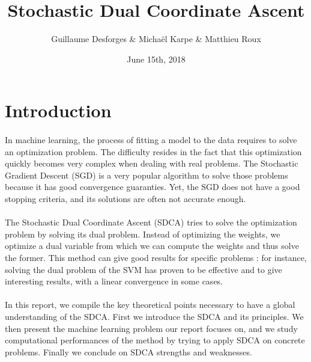 \documentclass{article}
\title{Stochastic Dual Coordinate Ascent}
\author{Guillaume Desforges \& Michaël Karpe \& Matthieu Roux}
\date{June 15th, 2018}
\begin{document}
\maketitle


\section*{Introduction}

\paragraph{}In machine learning, the process of fitting a model to the data requires to solve an optimization problem.
The difficulty resides in the fact that this optimization quickly becomes very complex when dealing with real problems.
The Stochastic Gradient Descent (SGD) is a very popular algorithm to solve those problems because it has good convergence guaranties.
Yet, the SGD does not have a good stopping criteria, and its solutions are often not accurate enough.

\paragraph{}The Stochastic Dual Coordinate Ascent (SDCA) tries to solve the optimization problem by solving its dual problem.
Instead of optimizing the weights, we optimize a dual variable from which we can compute the weights and thus solve the former.
This method can give good results for specific problems : for instance, solving the dual problem of the SVM has proven to be effective and to give interesting results, with a linear convergence in some cases.

\paragraph{}In this report, we compile the key theoretical points necessary to have a global understanding of the SDCA.
First we introduce the SDCA and its principles.
We then present the machine learning problem our report focuses on, and we study computational performances of the method by trying to apply SDCA on concrete problems.
Finally we conclude on SDCA strengths and weaknesses.
\end{document}
